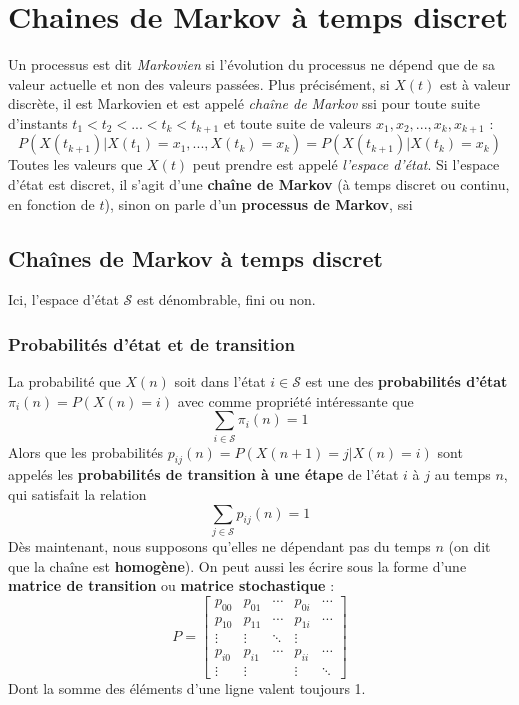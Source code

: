 \documentclass[11pt,a4paper]{article}
\numberwithin{equation}{section}
\begin{document}
\section{Chaines de Markov à temps discret}
Un processus est dit \textit{Markovien} si l'évolution du processus ne dépend que de sa valeur actuelle et non des valeurs passées. Plus précisément, si $X(t)$ est à valeur discrète, il est Markovien et est appelé \textit{chaîne de Markov} ssi pour toute suite d'instants $t_1<t_2<...<t_k<t_{k+1}$ et toute suite de valeurs $x_1,x_2,...,x_k,x_{k+1}$ :
\begin{equation}
    P(X(t_{k+1}) | X(t_1)=x_1,...,X(t_k) = x_k) = P(X(t_{k+1}) | X(t_k) = x_k)
\end{equation}
Toutes les valeurs que $X(t)$ peut prendre est appelé \textit{l'espace d'état}. Si l'espace d'état est discret, il s'agit d'une \textbf{chaîne de Markov} (à temps discret ou continu, en fonction de $t$), sinon on parle d'un \textbf{processus de Markov}, ssi 

\subsection{Chaînes de Markov à temps discret}
Ici, l'espace d'état $\mathcal{S}$ est dénombrable, fini ou non. 
\subsubsection{Probabilités d'état et de transition}
La probabilité que $X(n)$ soit dans l'état $i \in \mathcal{S}$ est une des \textbf{probabilités d'état} $\pi_i(n) = P(X(n) = i)$ avec comme propriété intéressante que 
\begin{equation}
    \sum_{i\in \mathcal{S}} \pi_i(n) = 1
\end{equation}
Alors que les probabilités $p_{ij}(n) = P(X(n+1) = j | X(n) = i)$ sont appelés les \textbf{probabilités de transition à une étape} de l'état $i$ à $j$ au temps $n$, qui satisfait la relation 
\begin{equation}
    \sum_{j \in \mathcal{S}} p_{ij}(n) = 1
\end{equation}
Dès maintenant, nous supposons qu'elles ne dépendant pas du temps $n$ (on dit que la chaîne est \textbf{homogène}). On peut aussi les écrire sous la forme d'une \textbf{matrice de transition} ou \textbf{matrice stochastique} :
\begin{equation}
    P = 
        \begin{bmatrix}
            p_{00} & p_{01} &\cdots & p_{0i}& \cdots\\
            p_{10} & p_{11} & \cdots & p_{1i} & \cdots\\
            \vdots & \vdots & \ddots & \vdots\\
            p_{i0} & p_{i1} & \cdots & p_{ii} & \cdots\\
            \vdots & \vdots & & \vdots & \ddots
        \end{bmatrix}
\end{equation}
Dont la somme des éléments d'une ligne valent toujours 1. 
\end{document}
